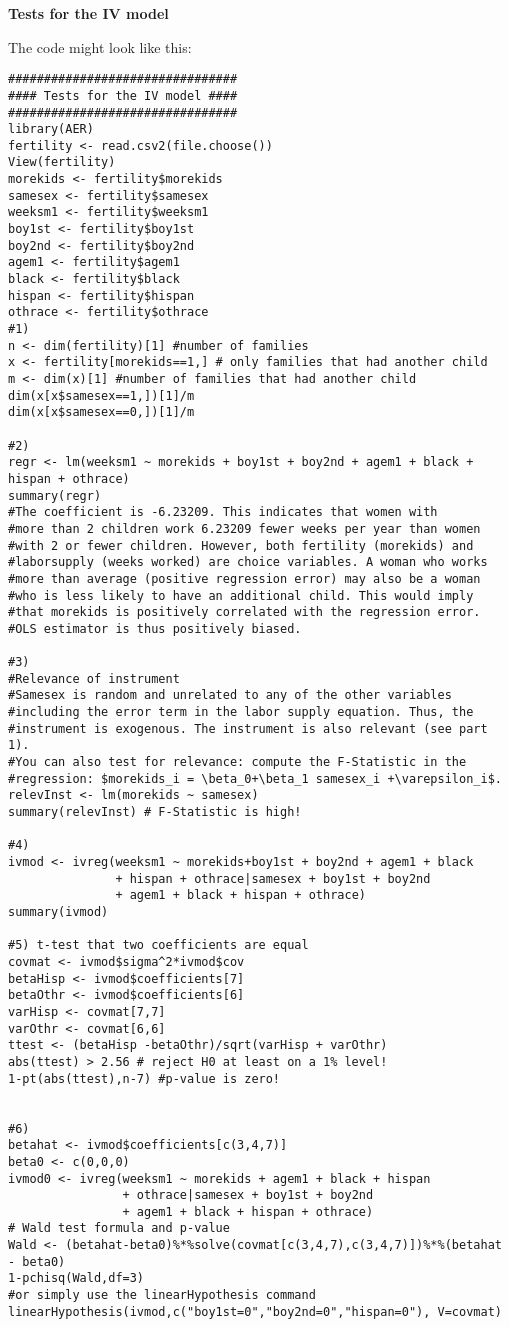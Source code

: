 \documentclass{article}
\begin{document}
\begin{solution}
\textbf{Tests for the IV model}

The code might look like this:
\begin{verbatim}
################################
#### Tests for the IV model ####
################################
library(AER)
fertility <- read.csv2(file.choose())
View(fertility)
morekids <- fertility$morekids
samesex <- fertility$samesex
weeksm1 <- fertility$weeksm1
boy1st <- fertility$boy1st
boy2nd <- fertility$boy2nd
agem1 <- fertility$agem1
black <- fertility$black
hispan <- fertility$hispan
othrace <- fertility$othrace
#1)
n <- dim(fertility)[1] #number of families
x <- fertility[morekids==1,] # only families that had another child
m <- dim(x)[1] #number of families that had another child
dim(x[x$samesex==1,])[1]/m
dim(x[x$samesex==0,])[1]/m

#2)
regr <- lm(weeksm1 ~ morekids + boy1st + boy2nd + agem1 + black + hispan + othrace)
summary(regr)
#The coefficient is -6.23209. This indicates that women with
#more than 2 children work 6.23209 fewer weeks per year than women
#with 2 or fewer children. However, both fertility (morekids) and
#laborsupply (weeks worked) are choice variables. A woman who works
#more than average (positive regression error) may also be a woman
#who is less likely to have an additional child. This would imply
#that morekids is positively correlated with the regression error.
#OLS estimator is thus positively biased.

#3)
#Relevance of instrument
#Samesex is random and unrelated to any of the other variables
#including the error term in the labor supply equation. Thus, the
#instrument is exogenous. The instrument is also relevant (see part 1).
#You can also test for relevance: compute the F-Statistic in the
#regression: $morekids_i = \beta_0+\beta_1 samesex_i +\varepsilon_i$.
relevInst <- lm(morekids ~ samesex)
summary(relevInst) # F-Statistic is high!

#4)
ivmod <- ivreg(weeksm1 ~ morekids+boy1st + boy2nd + agem1 + black
               + hispan + othrace|samesex + boy1st + boy2nd
               + agem1 + black + hispan + othrace)
summary(ivmod)

#5) t-test that two coefficients are equal
covmat <- ivmod$sigma^2*ivmod$cov
betaHisp <- ivmod$coefficients[7]
betaOthr <- ivmod$coefficients[6]
varHisp <- covmat[7,7]
varOthr <- covmat[6,6]
ttest <- (betaHisp -betaOthr)/sqrt(varHisp + varOthr)
abs(ttest) > 2.56 # reject H0 at least on a 1% level!
1-pt(abs(ttest),n-7) #p-value is zero!


#6)
betahat <- ivmod$coefficients[c(3,4,7)]
beta0 <- c(0,0,0)
ivmod0 <- ivreg(weeksm1 ~ morekids + agem1 + black + hispan
                + othrace|samesex + boy1st + boy2nd
                + agem1 + black + hispan + othrace)
# Wald test formula and p-value
Wald <- (betahat-beta0)%*%solve(covmat[c(3,4,7),c(3,4,7)])%*%(betahat - beta0)
1-pchisq(Wald,df=3)
#or simply use the linearHypothesis command
linearHypothesis(ivmod,c("boy1st=0","boy2nd=0","hispan=0"), V=covmat)
\end{verbatim}
\end{solution}
\end{document}
